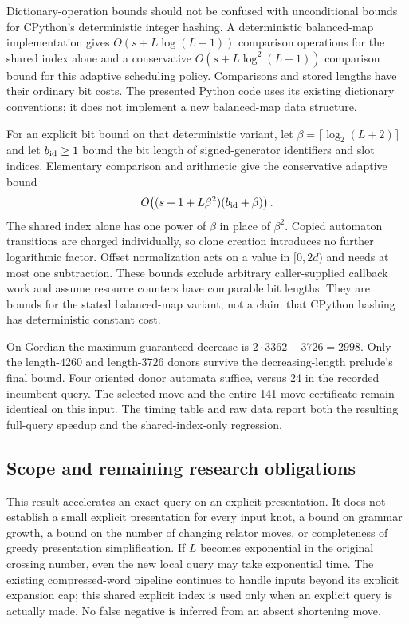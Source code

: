 Dictionary-operation bounds should not be confused with unconditional
bounds for CPython's deterministic integer hashing.  A deterministic
balanced-map implementation gives $O(s+L\log(L+1))$ comparison operations
for the shared index alone and a conservative
$O(s+L\log^2(L+1))$ comparison bound for this adaptive scheduling policy.
Comparisons and stored lengths have their ordinary bit costs.  The
presented Python code uses its existing dictionary conventions; it does
not implement a new balanced-map data structure.

For an explicit bit bound on that deterministic variant, let
$\beta=\lceil\log_2(L+2)\rceil$ and let $b_{\rm id}\ge1$ bound the bit
length of signed-generator identifiers and slot indices. Elementary
comparison and arithmetic give the conservative adaptive bound
\[
       O\!\left((s+1+L\beta^2)(b_{\rm id}+\beta)\right).
\]
The shared index alone has one power of $\beta$ in place of $\beta^2$.
Copied automaton transitions are charged individually, so clone creation
introduces no further logarithmic factor. Offset normalization acts on a
value in $[0,2d)$ and needs at most one subtraction. These bounds exclude
arbitrary caller-supplied callback work and assume resource counters have
comparable bit lengths. They are bounds for the stated balanced-map
variant, not a claim that CPython hashing has deterministic constant cost.

On Gordian the maximum guaranteed decrease is $2\cdot3362-3726=2998$.
Only the length-$4260$ and length-$3726$ donors survive the decreasing-length
prelude's final bound.  Four oriented donor automata suffice, versus 24
in the recorded incumbent query.  The selected move and the entire
141-move certificate remain identical on this input.  The timing table
and raw data report both the resulting full-query speedup and the
shared-index-only regression.

\subsection{Scope and remaining research obligations}

This result accelerates an exact query on an explicit presentation.  It
does not establish a small explicit presentation for every input knot,
a bound on grammar growth, a bound on the number of changing relator
moves, or completeness of greedy presentation simplification.  If $L$
becomes exponential in the original crossing number, even the new local
query may take exponential time.  The existing compressed-word pipeline
continues to handle inputs beyond its explicit expansion cap; this
shared explicit index is used only when an explicit query is actually
made.  No false negative is inferred from an absent shortening move.

